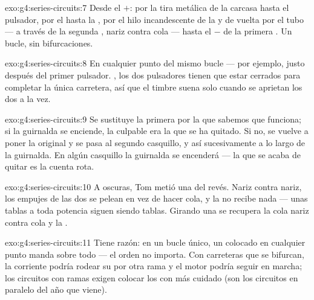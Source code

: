 \begin{solution}{exo:g4:series-circuits:7}
Desde el $+$: por la tira metálica de la carcasa hasta el
pulsador, por el  hasta la , por el hilo
incandescente de la  y de vuelta por el tubo --- a través de
la segunda , nariz contra cola --- hasta el $-$ de la primera
. Un bucle, sin bifurcaciones.
\end{solution}

\begin{solution}{exo:g4:series-circuits:8}
En cualquier punto del mismo bucle --- por ejemplo, justo después del
primer pulsador. , los dos pulsadores tienen que estar
cerrados para completar la única carretera, así que el timbre suena
solo cuando se aprietan los dos a la vez.
\end{solution}

\begin{solution}{exo:g4:series-circuits:9}
Se sustituye la primera  por la que sabemos que funciona; si la
guirnalda se enciende, la culpable era la que se ha quitado. Si no,
se vuelve a poner la original y se pasa al segundo casquillo, y así
sucesivamente a lo largo de la guirnalda. En algún casquillo la
guirnalda se encenderá --- la  que se acaba de quitar es la
cuenta rota.
\end{solution}

\begin{solution}{exo:g4:series-circuits:10}
A oscuras, Tom metió una  del revés. Nariz contra nariz, los
empujes de las dos  se pelean en vez de hacer cola, y la
 no recibe nada --- unas tablas a toda potencia siguen siendo
tablas. Girando una  se recupera la cola nariz contra cola y la
.
\end{solution}

\begin{solution}{exo:g4:series-circuits:11}
Tiene razón: en un bucle único, un  colocado en
cualquier punto manda sobre todo --- el orden no importa. Con
carreteras que se bifurcan, la corriente podría rodear su
 por otra rama y el motor podría seguir en marcha; los
circuitos con ramas exigen colocar los  con más
cuidado (son los circuitos en paralelo del año que viene).
\end{solution}
